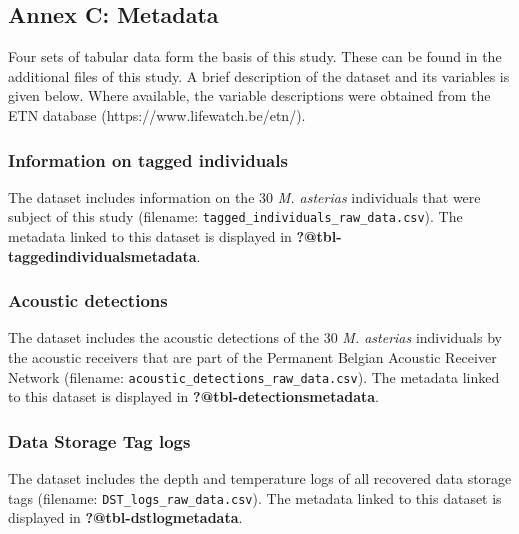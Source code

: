 \documentclass[
  authoryear,
  review,
  3p]{elsarticle}
\begin{document}
\hypertarget{annex-c-metadata}{%
\subsection*{\texorpdfstring{\textbf{Annex C}:
Metadata}{Annex C: Metadata}}\label{annex-c-metadata}}

Four sets of tabular data form the basis of this study. These can be
found in the additional files of this study. A brief description of the
dataset and its variables is given below. Where available, the variable
descriptions were obtained from the ETN database
(https://www.lifewatch.be/etn/).

\hypertarget{information-on-tagged-individuals}{%
\subsubsection*{Information on tagged
individuals}\label{information-on-tagged-individuals}}

The dataset includes information on the 30 \emph{M. asterias}
individuals that were subject of this study (filename:
\texttt{tagged\_individuals\_raw\_data.csv}). The metadata linked to
this dataset is displayed in \textbf{?@tbl-taggedindividualsmetadata}.

\hypertarget{acoustic-detections}{%
\subsubsection*{Acoustic detections}\label{acoustic-detections}}

The dataset includes the acoustic detections of the 30 \emph{M.
asterias} individuals by the acoustic receivers that are part of the
Permanent Belgian Acoustic Receiver Network (filename:
\texttt{acoustic\_detections\_raw\_data.csv}). The metadata linked to
this dataset is displayed in \textbf{?@tbl-detectionsmetadata}.

\hypertarget{data-storage-tag-logs}{%
\subsubsection*{Data Storage Tag logs}\label{data-storage-tag-logs}}

The dataset includes the depth and temperature logs of all recovered
data storage tags (filename: \texttt{DST\_logs\_raw\_data.csv}). The
metadata linked to this dataset is displayed in
\textbf{?@tbl-dstlogmetadata}.
\end{document}
